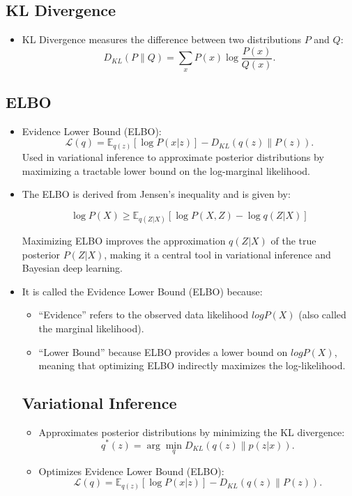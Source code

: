 \documentclass[12pt,a4paper]{article}
\begin{document}
\subsection{KL Divergence}
\begin{itemize}
    \item KL Divergence measures the difference between two distributions $P$ and $Q$:
    \[ D_{KL}(P \| Q) = \sum_x P(x) \log \frac{P(x)}{Q(x)}. \]
\end{itemize}
\subsection{ELBO}
\begin{itemize}
    \item Evidence Lower Bound (ELBO):
    \[ \mathcal{L}(q) = \mathbb{E}_{q(z)}[\log P(x | z)] - D_{KL}(q(z) \| P(z)). \]
    Used in variational inference to approximate posterior distributions by maximizing a tractable lower bound on the log-marginal likelihood.
    \item The ELBO is derived from Jensen’s inequality and is given by:  

\[
\log P(X) \geq \mathbb{E}_{q(Z|X)} \left[ \log P(X, Z) - \log q(Z|X) \right]
\]

Maximizing ELBO improves the approximation \( q(Z|X) \) of the true posterior \( P(Z|X) \), making it a central tool in variational inference and Bayesian deep learning.

    \item It is called the Evidence Lower Bound (ELBO) because:

\begin{itemize}
    \item ``Evidence'' refers to the observed data likelihood $log P(X)$ (also called the marginal likelihood).
    \item ``Lower Bound'' because ELBO provides a lower bound on $log P(X)$, meaning that optimizing ELBO indirectly maximizes the log-likelihood.
\end{itemize}
\subsection{Variational Inference}
\begin{itemize}
    \item Approximates posterior distributions by minimizing the KL divergence:
    \[ q^*(z) = \arg\min_q D_{KL}(q(z) \| p(z|x)). \]
    \item Optimizes Evidence Lower Bound (ELBO):
    \[ \mathcal{L}(q) = \mathbb{E}_{q(z)}[\log P(x|z)] - D_{KL}(q(z) \| P(z)). \]
\end{itemize}
\end{itemize}
\end{document}
